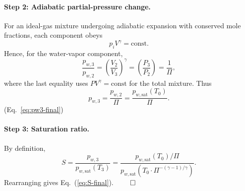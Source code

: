 \documentclass[11pt,a4paper]{article}
\newcommand{\pwsat}{p_{w,\text{sat}}}
\theoremstyle{definition}
\theoremstyle{plain}
\begin{document}
\paragraph{Step 2: Adiabatic partial-pressure change.}
For an ideal-gas mixture undergoing adiabatic expansion with conserved mole fractions, each component obeys
\begin{equation*}
p_i V^\gamma = \text{const}.
\end{equation*}
Hence, for the water-vapor component,
\begin{equation*}
\frac{p_{w,3}}{p_{w,2}} = \left(\frac{V_2}{V_3}\right)^\gamma = \left(\frac{P_3}{P_2}\right) = \frac{1}{\Pi},
\end{equation*}
where the last equality uses $PV^\gamma = \text{const}$ for the total mixture. Thus
\begin{equation*}
p_{w,3} = \frac{p_{w,2}}{\Pi} = \frac{\pwsat(T_0)}{\Pi}.
\end{equation*}
\hfill (Eq.~\ref{eq:pw3-final})

\paragraph{Step 3: Saturation ratio.}
By definition,
\begin{equation*}
S = \frac{p_{w,3}}{\pwsat(T_3)} = \frac{\pwsat(T_0)/\Pi}{\pwsat(T_0 \cdot \Pi^{-(\gamma-1)/\gamma})}.
\end{equation*}
Rearranging gives Eq.~(\ref{eq:S-final}). $\qed$
\end{document}
